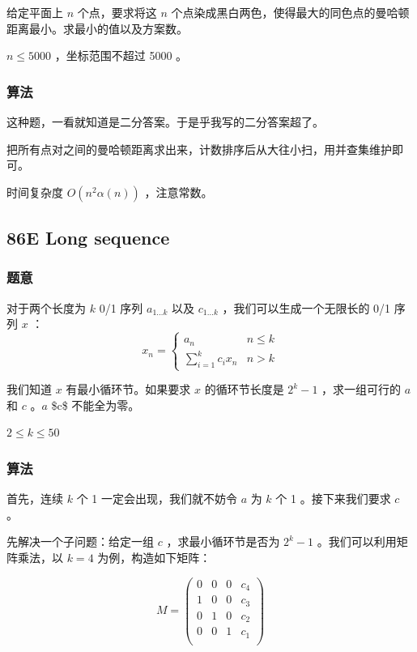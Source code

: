 \documentclass[11pt]{article}
\begin{document}
    给定平面上 $n$ 个点，要求将这 $n$ 个点染成黑白两色，使得最大的同色点的曼哈顿距离最小。求最小的值以及方案数。

    $n \leq 5000$ ，坐标范围不超过 5000 。
\subsubsection{算法}
\label{sec-6-5-2}

    这种题，一看就知道是二分答案。于是乎我写的二分答案超了。

    把所有点对之间的曼哈顿距离求出来，计数排序后从大往小扫，用并查集维护即可。

    时间复杂度 $O(n^2 \alpha(n))$ ，注意常数。
\subsection{86E   Long sequence}
\label{sec-6-6}
\subsubsection{题意}
\label{sec-6-6-1}

    对于两个长度为 $k$ 0/1 序列 $a_{1 \dots k}$ 以及 $c_{1 \dots k}$ ，我们可以生成一个无限长的 0/1 序列 $x$ ：
    $$x_n = \begin{cases} a_n & n \leq k \\ \sum_{i = 1}^k c_i x_n & n > k \end{cases}$$

    我们知道 $x$ 有最小循环节。如果要求 $x$ 的循环节长度是 $2^k - 1$ ，求一组可行的 $a$ 和 $c$ 。$a$ \$c\$ 不能全为零。

    $2 \leq k \leq 50$
\subsubsection{算法}
\label{sec-6-6-2}

    首先，连续 $k$ 个 1 一定会出现，我们就不妨令 $a$ 为 $k$ 个 1 。接下来我们要求 $c$ 。

    先解决一个子问题：给定一组 $c$ ，求最小循环节是否为 $2^k - 1$ 。我们可以利用矩阵乘法，以 $k = 4$ 为例，构造如下矩阵：

$$
M = 
\left(
\begin{array}{cccc}
0 & 0 & 0 & c_4 \\
1 & 0 & 0 & c_3 \\
0 & 1 & 0 & c_2 \\
0 & 0 & 1 & c_1 \\
\end{array}
\right)
$$
\end{document}
